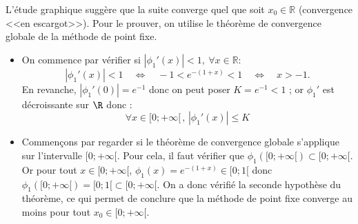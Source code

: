 {\begin{enumerate}
{%
%		
%			
%			
		L'étude graphique suggère que la suite converge quel que soit $x_0\in\mathbb{R}$ (convergence <<en escargot>>). Pour le prouver, on utilise le théorème de convergence globale de la méthode de point fixe.
		\begin{itemize}
			\item On commence par vérifier si $|\phi_1'(x)|<1, \ \forall x\in\mathbb{R}$: 
			\[ |\phi_1'(x)|<1 \quad \Leftrightarrow \quad -1<e^{-(1+x)}<1 \quad \Leftrightarrow \quad x>-1.\] 
			En revanche, $|\phi_1'(0)| = e^{-1}$ donc on peut poser $K = e^{-1} <1$ ; or $\phi_1'$ est décroissante sur $\R$ donc : $$\forall x \in [0;+\infty[ \, ,\,|\phi_1'(x)| \leq K$$ 
			\item Commençons par regarder si le théorème de convergence globale s'applique sur l'intervalle $[0;+\infty[$. Pour cela, il faut vérifier que $\phi_1([0;+\infty[)\subset  [0;+\infty[$. Or pour tout $x \in [0;+\infty[$, $\phi_1(x)=e^{-(1+x)} \in [0;1[$ donc $\phi_1([0;+\infty[)=[0;1[ \subset [0;+\infty[$. On a donc vérifié la seconde hypothèse du théorème, ce qui permet de conclure que la méthode de point fixe converge au moins pour tout $x_0\in[0;+\infty[$.

\end{itemize}}
\end{enumerate}}
